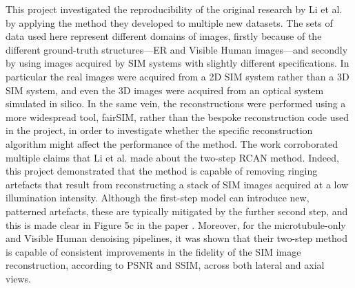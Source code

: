 \documentclass[12pt]{article}
\begin{document}
This project investigated the reproducibility of the original research by Li et al. by applying the method they developed to multiple new datasets.
The sets of data used here represent different domains of images,
firstly because of the different ground-truth structures---ER and Visible Human images---and secondly
by using images acquired by SIM systems with slightly different specifications.
In particular the real images were acquired from a 2D SIM system rather than a 3D SIM system,
and even the 3D images were acquired from an optical system simulated in silico.
In the same vein, the reconstructions were performed using a more widespread tool, fairSIM,
rather than the bespoke reconstruction code used in the project,
in order to investigate whether the specific reconstruction algorithm might affect the performance of the method.
The work corroborated multiple claims that Li et al. made about the two-step RCAN method.
Indeed, this project demonstrated that the method is capable of removing ringing artefacts that result from reconstructing a stack of SIM images acquired at a low illumination intensity.
Although the first-step model can introduce new, patterned artefacts, these are typically mitigated by the further second step,
and this is made clear in Figure 5c in the paper \cite{keypaper}.
Moreover, for the microtubule-only and Visible Human denoising pipelines,
it was shown that their two-step method is capable of consistent improvements in the fidelity of the SIM image reconstruction,
according to PSNR and SSIM, across both lateral and axial views.
\end{document}

